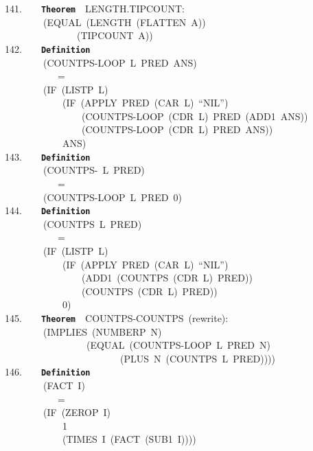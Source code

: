 \documentclass[11pt]{book}
\newenvironment{pubasis}{\begin{flushleft}\ttfamily\small}{\normalsize\rmfamily\end{flushleft}}
\newcommand{\axiomordefinition}[1]{\vspace{6pt}\texttt{\textbf{#1}}}
\begin{document}
\begin{pubasis}
141.~~~~\axiomordefinition{Theorem}~~LENGTH.TIPCOUNT:\\
~~~~~~~~(EQUAL~(LENGTH~(FLATTEN~A))\\
~~~~~~~~~~~~~~~(TIPCOUNT~A))\\

142.~~~~\axiomordefinition{Definition}\\
~~~~~~~~(COUNTPS-LOOP~L~PRED~ANS)\\
~~~~~~~~~~~=\\
~~~~~~~~(IF~(LISTP~L)\\
~~~~~~~~~~~~(IF~(APPLY~PRED~(CAR~L)~``NIL'')\\
~~~~~~~~~~~~~~~~(COUNTPS-LOOP~(CDR~L)~PRED~(ADD1~ANS))\\
~~~~~~~~~~~~~~~~(COUNTPS-LOOP~(CDR~L)~PRED~ANS))\\
~~~~~~~~~~~~ANS)\\

143.~~~~\axiomordefinition{Definition}\\
~~~~~~~~(COUNTPS-~L~PRED)\\
~~~~~~~~~~~=\\
~~~~~~~~(COUNTPS-LOOP~L~PRED~0)\\

144.~~~~\axiomordefinition{Definition}\\
~~~~~~~~(COUNTPS~L~PRED)\\
~~~~~~~~~~~=\\
~~~~~~~~(IF~(LISTP~L)\\
~~~~~~~~~~~~(IF~(APPLY~PRED~(CAR~L)~``NIL'')\\
~~~~~~~~~~~~~~~~(ADD1~(COUNTPS~(CDR~L)~PRED))\\
~~~~~~~~~~~~~~~~(COUNTPS~(CDR~L)~PRED))\\
~~~~~~~~~~~~0)\\

145.~~~~\axiomordefinition{Theorem}~~COUNTPS-COUNTPS~(rewrite):\\
~~~~~~~~(IMPLIES~(NUMBERP~N)\\
~~~~~~~~~~~~~~~~~(EQUAL~(COUNTPS-LOOP~L~PRED~N)\\
~~~~~~~~~~~~~~~~~~~~~~~~(PLUS~N~(COUNTPS~L~PRED))))\\

146.~~~~\axiomordefinition{Definition}\\
~~~~~~~~(FACT~I)\\
~~~~~~~~~~~=\\
~~~~~~~~(IF~(ZEROP~I)\\
~~~~~~~~~~~~1\\
~~~~~~~~~~~~(TIMES~I~(FACT~(SUB1~I))))\\


\end{pubasis}
\end{document}
